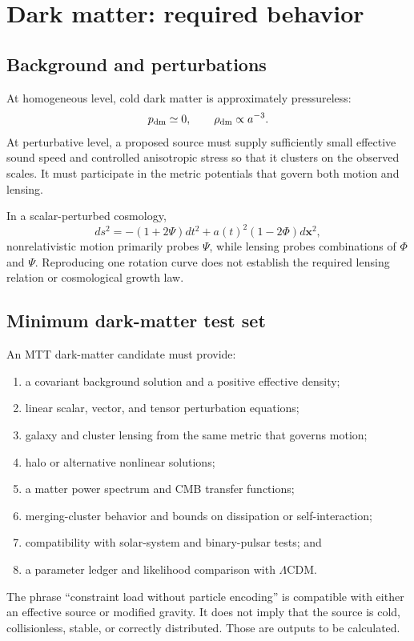 \documentclass[11pt]{article}
\begin{document}
\section{Dark matter: required behavior}

\subsection{Background and perturbations}

At homogeneous level, cold dark matter is approximately pressureless:
\[
 p_{\rm dm}\simeq0,
 \qquad
 \rho_{\rm dm}\propto a^{-3}.
\]
At perturbative level, a proposed source must supply sufficiently small
effective sound speed and controlled anisotropic stress so that it clusters
on the observed scales. It must participate in the metric potentials that
govern both motion and lensing.

In a scalar-perturbed cosmology,
\[
 ds^2=-(1+2\Psi)dt^2
 +a(t)^2(1-2\Phi)d\mathbf x^2,
\]
nonrelativistic motion primarily probes \(\Psi\), while lensing probes
combinations of \(\Phi\) and \(\Psi\). Reproducing one rotation curve does
not establish the required lensing relation or cosmological growth law.

\subsection{Minimum dark-matter test set}

An MTT dark-matter candidate must provide:
\begin{enumerate}[leftmargin=*]
\item a covariant background solution and a positive effective density;
\item linear scalar, vector, and tensor perturbation equations;
\item galaxy and cluster lensing from the same metric that governs motion;
\item halo or alternative nonlinear solutions;
\item a matter power spectrum and CMB transfer functions;
\item merging-cluster behavior and bounds on dissipation or self-interaction;
\item compatibility with solar-system and binary-pulsar tests; and
\item a parameter ledger and likelihood comparison with \(\Lambda\)CDM.
\end{enumerate}

The phrase ``constraint load without particle encoding'' is compatible with
either an effective source or modified gravity. It does not imply that the
source is cold, collisionless, stable, or correctly distributed. Those are
outputs to be calculated.
\end{document}
